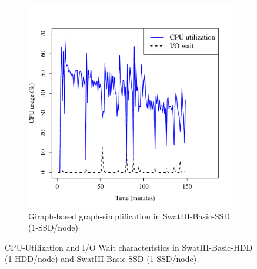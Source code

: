 \documentclass[conference]{IEEEtran}
\begin{document}
\begin{figure}[htb]
\begin{subfigure}[b]{0.23\textwidth}
                \includegraphics[width=\textwidth]{Figure/SystemData/Plots/ECCPUSSD.pdf}
                \caption{Giraph-based graph-simplification in SwatIII-Basic-SSD (1-SSD/node)}
                \label{fig:ECCPUSSD}
        \end{subfigure}
        \caption{CPU-Utilization and I/O Wait characteristics in SwatIII-Basic-HDD (1-HDD/node) and SwatIII-Basic-SSD (1-SSD/node)}\label{fig:HddSsdCPU}
        \vspace{-1.5em}
\end{figure}
\end{document}
